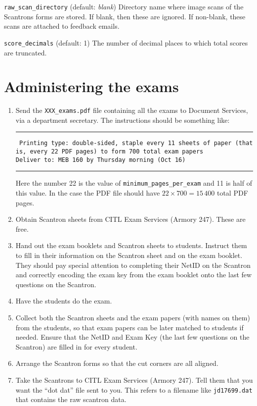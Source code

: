 \documentclass{article}
\begin{document}
\hangindent=1cm \texttt{raw_scan_directory} (default: \emph{blank})
Directory name where image scans of the Scantrons forms are stored. If
blank, then these are ignored. If non-blank, these scans are attached
to feedback emails.

\hangindent=1cm \texttt{score_decimals} (default: 1)
The number of decimal places to which total scores are truncated.

\section{Administering the exams}

\begin{enumerate}
\item Send the \texttt{XXX_exams.pdf} file
  containing all the exams to Document Services, via a department
  secretary. The instructions should be something like:

  \rule{\linewidth}{0.5pt}

  \parbox{\linewidth}{
    \tt
    Printing type: double-sided, staple every 11 sheets of paper (that is, every 22 PDF pages) to form 700 total exam papers \\
    Deliver to: MEB 160 by Thursday morning (Oct 16)
  }

  \rule{\linewidth}{0.5pt}

  Here the number 22 is the value of \texttt{minimum_pages_per_exam} and
  11 is half of this value. In the case the PDF file should have $22
  \times 700 = 15\,400$ total PDF pages.
\item Obtain Scantron sheets from CITL Exam Services (Armory
  247). These are free.
\item Hand out the exam booklets and Scantron sheets to
  students. Instruct them to fill in their information on the Scantron
  sheet and on the exam booklet. They should pay special attention to
  completing their NetID on the Scantron and correctly encoding the
  exam key from the exam booklet onto the last few questions on the
  Scantron.
\item Have the students do the exam.
\item Collect both the Scantron sheets and the exam papers (with names
  on them) from the students, so that exam papers can be later matched
  to students if needed. Ensure that the NetID and Exam Key (the last
  few questions on the Scantron) are filled in for every student.
\item Arrange the Scantron forms so that the cut corners are all
  aligned.
\item Take the Scantrons to CITL Exam Services (Armory 247). Tell them
  that you want the ``dot dat'' file sent to you. This refers to a
  filename like \texttt{jd17699.dat} that contains the raw scantron
  data.
\end{enumerate}
\end{document}
